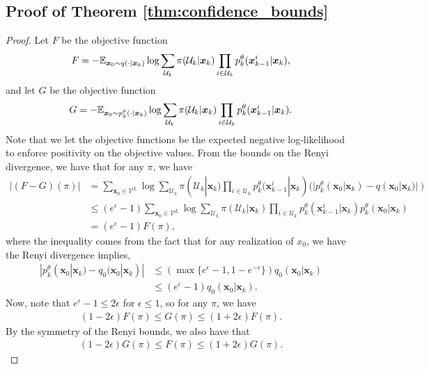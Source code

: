 \iffalse
\subsection{Proof of Theorem \ref{thm:confidence_bounds}}
\begin{proof}
    Let $F$ be the objective function
\begin{align*}
    F = -\mathbb{E}_{\bm x_0\sim q(\cdot |\bm x_k)}\log \sum_{\mathcal U_k}\pi(\mathcal U_k|\bm x_k)\prod_{i\in\mathcal U_{k}}p^\theta_k(\bm x^i_{k-1}|\bm x_k),
\end{align*}
and let $G$ be the objective function
\begin{align*}
    G = -\mathbb{E}_{\bm x_0\sim p^\theta_k(\cdot |\bm x_k)}\log \sum_{\mathcal U_k}\pi(\mathcal U_k|\bm x_k)\prod_{i\in\mathcal U_{k}}p^\theta_k(\bm x^i_{k-1}|\bm x_k).
\end{align*}
Note that we let the objective functions be the expected negative log-likelihood to enforce positivity on the objective values. From the bounds on the Renyi divergence, we have that for any $\pi$, we have
\begin{align*}
    |(F-G)(\pi)| &= \sum_{\bm x_0 \in \mathcal{V}^L}\log \sum_{\mathcal U_k}\pi(\mathcal U_k|\bm x_k)\prod_{i\in\mathcal U_{k}}p^\theta_k(\bm x^i_{k-1}|\bm x_k)(|p^\theta_k(\bm x_0|\bm x_k)-q(\bm x_0|\bm x_k)|)\\
    &\leq(e^\epsilon-1)\sum_{\bm x_0 \in \mathcal{V}^L}\log \sum_{\mathcal U_k}\pi(\mathcal U_k|\bm x_k)\prod_{i\in\mathcal U_{k}}p^\theta_k(\bm x^i_{k-1}|\bm x_k)p^\theta_k(\bm x_0|\bm x_k) \\
    &= (e^\epsilon-1)F(\pi),
\end{align*}
where the inequality comes from the fact that for any realization of $x_0$, we have the Renyi divergence implies,
\begin{align*}
    |p^\theta_k(\bm x_0|\bm x_k)-q_0(\bm x_0|\bm x_k)| &\leq (\max\{e^\epsilon-1, 1-e^{-\epsilon}\})q_0(\bm x_0|\bm x_k) \\
    &\leq (e^\epsilon-1)q_0(\bm x_0|\bm x_k).
\end{align*}
Now, note that $e^\epsilon-1 \leq 2\epsilon$ for $\epsilon \leq 1$, so for any $\pi$, we have
\begin{align*}
    (1-2\epsilon)F(\pi) \leq G(\pi) \leq (1+2\epsilon)F(\pi).
\end{align*}
By the symmetry of the Renyi bounds, we also have that
\begin{align*}
    (1-2\epsilon)G(\pi) \leq F(\pi) \leq (1+2\epsilon)G(\pi).
\end{align*}

\end{proof}
